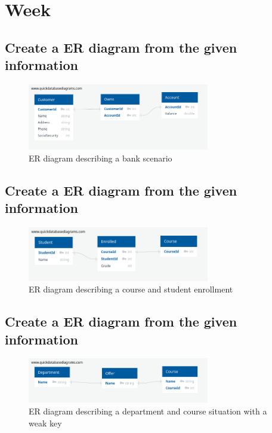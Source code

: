 \documentclass[12pt, a4paper]{article}
\begin{document}
		\section{Week}
			\subsection{Create a ER diagram from the given information}
				\begin{figure}[h!]
						  \centering
						  \includegraphics[width=300px]{assets/W12E1.png}
						  \caption{ER diagram describing a bank scenario}
				\end{figure}
			\subsection{Create a ER diagram from the given information}
				\begin{figure}[h!]
						  \centering
						  \includegraphics[width=300px]{assets/W12E2.png}
						  \caption{ER diagram describing a course and student enrollment}
				\end{figure}
		 	\subsection{Create a ER diagram from the given information}
				\begin{figure}[h!]
						  \centering
						  \includegraphics[width=300px]{assets/W12E3.png}
						  \caption{ER diagram describing a department and course situation with a weak key}
				\end{figure}
\end{document}
